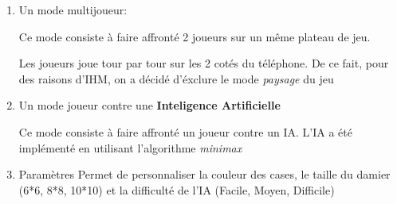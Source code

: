 \documentclass{article}
\begin{document}
\begin{enumerate}
\item Un mode multijoueur:

Ce mode consiste à faire affronté 2 joueurs sur un même plateau de jeu.

Les joueurs joue tour par tour sur les 2 cotés du téléphone. 
De ce fait, pour des raisons d'IHM, on a décidé d'éxclure le mode \textit{paysage} du jeu

\item Un mode joueur contre une \textbf{Inteligence Artificielle}

Ce mode consiste à faire affronté un joueur contre un IA.
L'IA a été implémenté en utilisant l'algorithme \textit{minimax}~\cite{miniMax}

\item Paramètres
Permet de personnaliser la couleur des cases, le taille du damier (6*6, 8*8, 10*10) 
et la difficulté de l'IA (Facile, Moyen, Difficile)


\end{enumerate}
\end{document}
